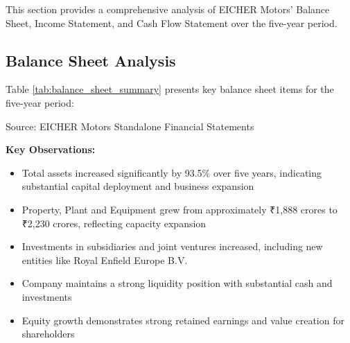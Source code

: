 \documentclass[8pt,a4paper]{article}
\begin{document}
This section provides a comprehensive analysis of EICHER Motors' Balance Sheet, Income Statement, and Cash Flow Statement over the five-year period.

\subsection{Balance Sheet Analysis}

Table \ref{tab:balance_sheet_summary} presents key balance sheet items for the five-year period:

\begin{table}[H]
\centering
\caption{Balance Sheet Summary (Amounts in ₹ Crores)}
\label{tab:balance_sheet_summary}

\footnotesize
Source: EICHER Motors Standalone Financial Statements
\end{table}

\textbf{Key Observations:}
\begin{itemize}
    \item Total assets increased significantly by 93.5\% over five years, indicating substantial capital deployment and business expansion
    \item Property, Plant and Equipment grew from approximately ₹1,888 crores to ₹2,230 crores, reflecting capacity expansion
    \item Investments in subsidiaries and joint ventures increased, including new entities like Royal Enfield Europe B.V.
    \item Company maintains a strong liquidity position with substantial cash and investments
    \item Equity growth demonstrates strong retained earnings and value creation for shareholders
\end{itemize}
\end{document}
